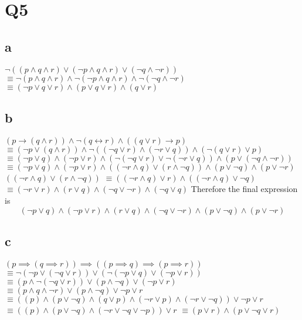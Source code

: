 \documentclass[12pt]{article}
\begin{document}
\section{Q5}

\subsection{a}
$\neg((p\land q\land r)\lor (\neg p\land q\land r)\lor (\neg q\land \neg r))$
\newline
$\equiv \neg(p\land q\land r)\land \neg (\neg p\land q\land r)\land \neg(\neg q\land \neg r)$
\newline
$\equiv (\neg p \lor q \lor r) \land (p \lor q \lor r) \land (q \lor r)$

\subsection{b}
$(p\to (q\land r))\land \neg (q\leftrightarrow r)\land ((q\lor r)\to p)$
\newline
$\equiv (\neg p \lor (q \land r)) \land \neg((\neg q \lor r) \land (\neg r \lor q)) \land (\neg (q \lor r) \lor p)$
\newline
$\equiv (\neg p \lor q) \land (\neg p \lor r) \land (\neg(\neg q \lor r) 
\lor \neg(\neg r \lor q)) \land (p \lor (\neg q \land \neg r))$
\newline
$\equiv (\neg p \lor q) \land (\neg p \lor r) \land ((\neg r \land q) \lor (r \land \neg q)) \land (p \lor \neg q) \land (p \lor \neg r) $
\newline
$((\neg r \land q) \lor (r \land \neg q))$
$\equiv ((\neg r \land q) \lor r) \land ((\neg r \land q) \lor \neg q)$
\newline
$\equiv (\neg r \lor r) \land (r \lor q) \land (\neg q \lor \neg r) \land (\neg q \lor q)$
\newline
Therefore the final expression is
$$(\neg p \lor q) \land (\neg p \lor r) \land  (r \lor q) \land (\neg q \lor \neg r) \land (p \lor \neg q) \land (p \lor \neg r) $$

\subsection{c}
$(p \implies (q \implies r)) \implies ((p \implies q) \implies (p \implies r))$
\newline
$\equiv \neg(\neg p \lor (\neg q \lor r)) \lor (\neg(\neg p \lor q) \lor (\neg p \lor r))$
\newline
$\equiv (p \land \neg(\neg q \lor r)) \lor ( p \land \neg q) \lor (\neg p \lor r)$
\newline
$\equiv (p \land q \land \neg r) \lor ( p \land \neg q) \lor \neg p \lor r$
\newline
$\equiv ((p) \land (p \lor \neg q) \land (q \lor p) \land (\neg r \lor p) \land (\neg r \lor \neg q)) \lor \neg p \lor r$
\newline
$\equiv ((p) \land (p \lor \neg q) \land (\neg r \lor \neg q \lor \neg p)) \lor r$
\newline
$\equiv (p \lor r) \land (p \lor \neg q \lor r)$
\end{document}
